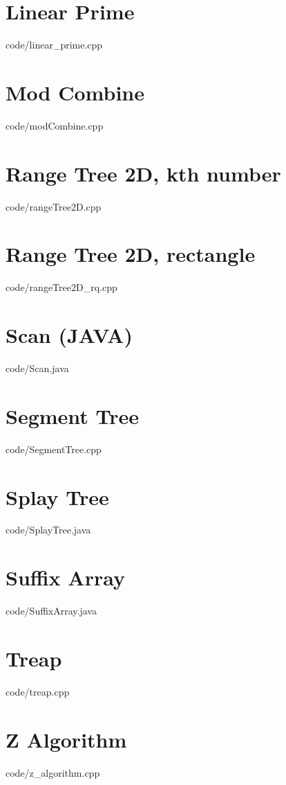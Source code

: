 \documentclass [landscape,10pt,a4paper,twocolumn]{article}
\begin{document}
\section{Linear Prime}
 {code/linear_prime.cpp}
\section{Mod Combine}
 {code/modCombine.cpp}
\section{Range Tree 2D, kth number}
 {code/rangeTree2D.cpp}
\section{Range Tree 2D, rectangle}
 {code/rangeTree2D_rq.cpp}
\section{Scan (JAVA)}
 {code/Scan.java}
\section{Segment Tree}
 {code/SegmentTree.cpp}
\section{Splay Tree}
 {code/SplayTree.java}
\section{Suffix Array}
 {code/SuffixArray.java}
\section{Treap}
 {code/treap.cpp}
\section{Z Algorithm}
 {code/z_algorithm.cpp}
\end{document}

